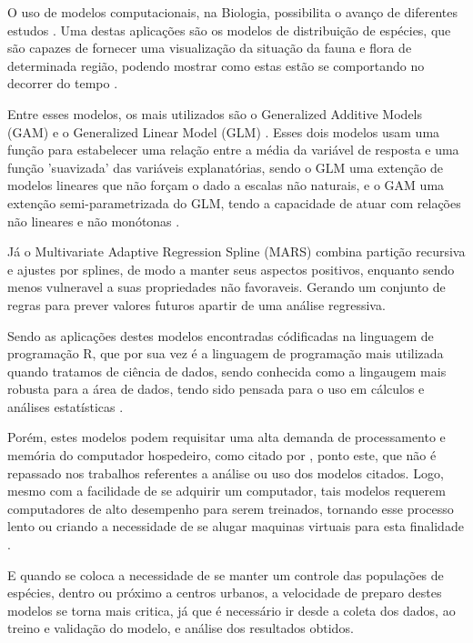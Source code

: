 \documentclass[
	12pt,				%
	openright,			%
	oneside,			%
	a4paper,			%
	english,			%
	brazil				%
	]{abntex2}
\begin{document}
O uso de modelos computacionais, na Biologia, possibilita o avanço de diferentes
estudos \cite{modelagem_comp}. Uma destas aplicações são os modelos de distribuição 
de espécies, que são capazes de fornecer uma visualização da situação 
da fauna e flora de determinada região, podendo mostrar como estas estão se 
comportando no decorrer do tempo \cite{speciesDistributionModels}.

Entre esses modelos, os mais utilizados são o Generalized Additive Models (GAM) \cite{GAM}
e o Generalized Linear Model (GLM) \cite{GLM}. Esses dois modelos usam uma função para 
estabelecer uma relação entre a média da variável de resposta e uma função 'suavizada'
das variáveis explanatórias, sendo o GLM uma extenção de modelos lineares que não
forçam o dado a escalas não naturais, e o GAM uma extenção semi-parametrizada do GLM,
tendo a capacidade de atuar com relações não lineares e não monótonas \cite{GAMeGLM_especie_estudo}. 

Já o Multivariate Adaptive Regression Spline (MARS) combina partição recursiva e ajustes
por splines, de modo a manter seus aspectos positivos, enquanto sendo menos vulneravel a 
suas propriedades não favoraveis. Gerando um conjunto de regras para prever
valores futuros apartir de uma análise regressiva. \cite{MARS} 

Sendo as aplicações destes modelos encontradas códificadas na linguagem de programação R, que por
sua vez é a linguagem de programação mais utilizada quando tratamos de ciência de dados, sendo conhecida
como a lingaugem mais robusta para a área de dados, tendo sido pensada para o uso em cálculos e
análises estatísticas \cite{linguagem_r}.

Porém, estes modelos podem requisitar uma alta demanda de processamento e memória do computador hospedeiro, 
como citado por \cite{modelagem_comp}, ponto este, que não é repassado nos trabalhos referentes a análise 
ou uso dos modelos citados. Logo, mesmo com a facilidade de se adquirir um computador, tais modelos
requerem computadores de alto desempenho para serem treinados, tornando esse processo lento ou criando 
a necessidade de se alugar maquinas virtuais para esta finalidade \cite{global_cloud_maketing}. 

E quando se coloca a necessidade de se manter um controle das populações de espécies, dentro ou próximo
a centros urbanos, a velocidade de preparo destes modelos se torna mais critica, já que é necessário ir
desde a coleta dos dados, ao treino e validação do modelo, e análise dos resultados obtidos.
 
\end{document}
